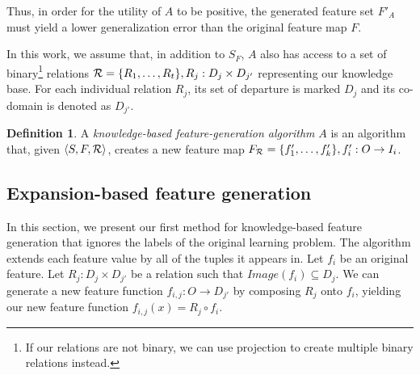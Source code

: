 \documentclass[letterpaper]{article} %
\theoremstyle{definition}
\newtheorem{defn}{Definition}[section]
\begin{document}
Thus, in order for the utility of $A$ to be positive, the generated feature set $F'_A$ must yield a lower generalization error than the original feature map $F$.

In this work, we assume that, in addition to $S_F$, $A$ also has access to a set of binary\footnote{If our relations are not binary, we can use projection to create multiple binary relations instead.} relations ${\cal R}=\{R_{1},\ldots,R_{t}\}, R_j:D_j\times D_{j'}$ representing our knowledge base. For each individual relation $R_j$, its set of departure is marked $D_j$ and its co-domain is denoted as $D_{j'}$. 
\begin{defn}
	A \emph{knowledge-based feature-generation algorithm} $A$ is an algorithm that, given $\langle S,F,{\cal R} \rangle$, creates a new feature map $F_{{\cal R}}=\{f'_{1},\ldots,f'_{k}\}, f'_{i}:O\rightarrow I_i$.
\end{defn}


\subsection{Expansion-based feature generation} \label{shallow_section}

In this section, we present our first method for knowledge-based feature generation that ignores the labels of the original learning problem.
The algorithm extends each feature value by all of the tuples it appears in.
Let $f_i$ be an original feature. Let $R_j:D_j\times D_{j'}$ be a relation such that  $Image(f_i) \subseteq D_j$. We can generate a new feature function $f_{i,j}:O\rightarrow D_{j'}$ by composing $R_j$ onto $f_i$, yielding our new feature function  $f_{i,j}(x)=R_j\circ f_i$.

\end{document}
